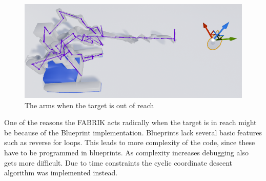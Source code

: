 \begin{figure}[hbtp]
\centering
\includegraphics[width=1\textwidth]{FABRIK/Robot_OutOfReach.PNG}
\caption{The arms when the target is out of reach}
\end{figure}

One of the reasons the FABRIK acts radically when the target is in reach might be because of the Blueprint implementation. Blueprints lack several basic features such as reverse for loops. This leads to more complexity of the code, since these have to be programmed in blueprints. As complexity increases debugging also gets more difficult. 
Due to time constraints the cyclic coordinate descent algorithm was implemented instead. 